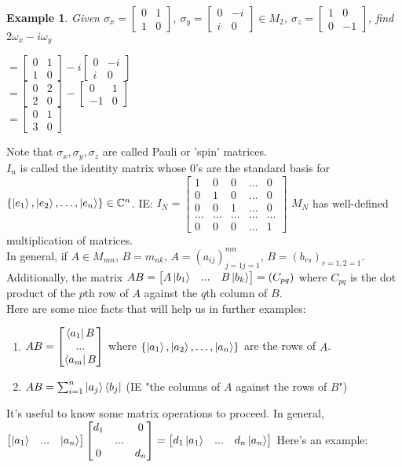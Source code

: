\documentclass[12pt]{article}
\theoremstyle{plain}
\theoremstyle{nonumberplain}
\theoremstyle{plain}
\newtheorem{example}[lemma]{Example}
\theoremstyle{nonumberplain}
\newcommand\1{{\bf 1}}
\newcommand{\bmat}[1]{\begin{bmatrix*} #1 \end{bmatrix*}} %
\newcommand{\C}{\mathbb{C}} %
\newcommand{\<}{\left\langle}
\renewcommand{\>}{\right\rangle}
\newcommand{\lb}{\left\{}
\newcommand{\rb}{\right\}}
\newcommand{\setofkets}[1]{\lb \ket{#1_1}, \ket{#1_2}, \ldots, \ket{#1_n}\rb} %
\begin{document}
\begin{example}
Given $\sigma_x=\bmat{0 & 1 \\ 1 & 0}$, $\sigma_y=\bmat{0 & -i \\ i & 0}\in M_2$, $\sigma_z=\bmat{1 & 0 \\ 0 & -1}$, find $2\omega_x-i\omega_y$
\begin{center}
$=\bmat{0 & 1 \\ 1 & 0}-i\bmat{0 & -i \\ i & 0}$ \\
$=\bmat{0 & 2 \\ 2 & 0}-\bmat{0 & 1 \\ -1 & 0}$ \\
$=\bmat{0 & 1 \\ 3 & 0}$
\end{center}
\end{example}
Note that $\sigma_x,\sigma_y,\sigma_z$ are called Pauli or 'spin' matrices. \\
$I_n$ is called the identity matrix whose $0$'s are the standard basis for $\setofkets{e}\in\C^n$. IE: $I_N=\bmat{1 & 0 & 0 & ... & 0 \\ 0 & 1 & 0 & ... & 0 \\ 0 & 0 & 1 & ... & 0 \\ ... & ... & ... & ... & ... \\ 0 & 0 & 0 & ... & 1}$ $M_N$ has well-defined multiplication of matrices. \\ In general, if $A\in M_{mn}$, $B=m_{nk}$, $A=(a_{ij})^{mn}_{j=1 j=1}$, $B=(b_{rs})_{r=1, 2=1}$. Additionally, the matrix $AB=\bmat{A\ket{b_1} & ... & B\ket{b_k}}=(C_{pq})$ where $C_{pq}$ is the dot product of the $p$th row of $A$ against the $q$th column of $B$. \\
Here are some nice facts that will help us in further examples:
\begin{enumerate}
\item $AB=\bmat{\bra{a_1}B \\ ... \\ \bra{a_m}B}$ where $\setofkets{a}$ are the rows of $A$.
\item $AB=\sum^n_{i=1}\ket{a_j}\bra{b_j}$ (IE "the columns of $A$ against the rows of $B$")
\end{enumerate}
It's useful to know some matrix operations to proceed. In general, $\bmat{\ket{a_1} & ... & \ket{a_n}}\bmat{d_1 & & 0 \\ & ... & \\ 0 & & d_n}=\bmat{d_1\ket{a_1} & ... & d_n\ket{a_n}}$ Here's an example:
\end{document}
